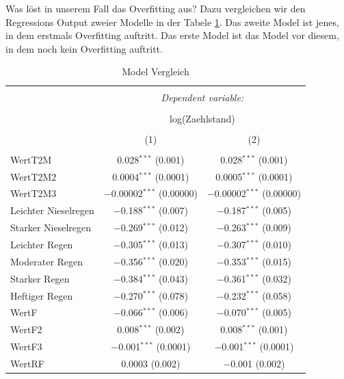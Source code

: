 \documentclass[a4paper,12pt]{thesis}
\begin{document}
Was löst in unserem Fall das Overfitting aus? Dazu vergleichen wir den Regressions Output zweier Modelle in der Tabele \ref{ZweiModelle}. Das zweite Model ist jenes, in dem erstmals Overfitting auftritt. Das erste Model ist das Model vor diesem, in dem noch kein Overfitting auftritt.


	\begin{longtable}{@{\extracolsep{-5pt}}lcc} 
		\caption{Model Vergleich} 
		\label{ZweiModelle}
	\small 
		\\[-1.8ex]\hline 
		\hline \\[-1.8ex] 
		& \multicolumn{2}{c}{\textit{Dependent variable:}} \\ 
		\cline{2-3} 
		\\[-1.8ex] & \multicolumn{2}{c}{log(Zaehlstand)} \\ 
		\\[-1.8ex] & (1) & (2)\\ 
		\hline \\[-1.8ex] 
		WertT2M & 0.028$^{***}$ (0.001) & 0.028$^{***}$ (0.001) \\ 
		WertT2M2 & 0.0004$^{***}$ (0.0001) & 0.0005$^{***}$ (0.0001) \\ 
		WertT2M3 & $-$0.00002$^{***}$ (0.00000) & $-$0.00002$^{***}$ (0.00000) \\ 
		Leichter Nieselregen & $-$0.188$^{***}$ (0.007) & $-$0.187$^{***}$ (0.005) \\ 
		Starker Nieselregen & $-$0.269$^{***}$ (0.012) & $-$0.263$^{***}$ (0.009) \\ 
		Leichter Regen & $-$0.305$^{***}$ (0.013) & $-$0.307$^{***}$ (0.010) \\ 
		Moderater Regen & $-$0.356$^{***}$ (0.020) & $-$0.353$^{***}$ (0.015) \\ 
		Starker Regen & $-$0.384$^{***}$ (0.043) & $-$0.361$^{***}$ (0.032) \\ 
		Heftiger Regen & $-$0.270$^{***}$ (0.078) & $-$0.232$^{***}$ (0.058) \\ 
		WertF & $-$0.066$^{***}$ (0.006) & $-$0.070$^{***}$ (0.005) \\ 
		WertF2 & 0.008$^{***}$ (0.002) & 0.008$^{***}$ (0.001) \\ 
		WertF3 & $-$0.001$^{***}$ (0.0001) & $-$0.001$^{***}$ (0.0001) \\ 
		WertRF & 0.0003 (0.002) & $-$0.001 (0.002) \\ 

\end{longtable}
\end{document}
